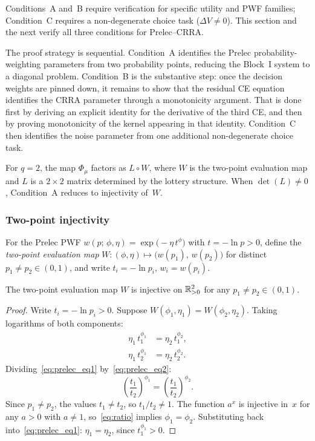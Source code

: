 Conditions~A and~B require verification for specific utility and
PWF families; Condition~C requires a non-degenerate choice task
($\Delta V \neq 0$). This section and the next verify all three
conditions for Prelec--CRRA.

The proof strategy is sequential. Condition~A identifies the Prelec
probability-weighting parameters from two probability points, reducing the
Block~I system to a diagonal problem. Condition~B is the substantive step: once
the decision weights are pinned down, it remains to show that the residual CE
equation identifies the CRRA parameter through a monotonicity argument. That is
done first by deriving an explicit identity for the derivative of the third CE,
and then by proving monotonicity of the kernel appearing in that identity.
Condition~C then identifies the noise parameter from one additional
non-degenerate choice task.

For $q = 2$, the map $\Phi_\mu$ factors as $L \circ W$, where
$W$ is the two-point evaluation map and $L$ is a $2 \times 2$
matrix determined by the lottery structure. When $\det(L) \neq 0$,
Condition~A reduces to injectivity of~$W$.

\subsubsection{Two-point injectivity}
\label{appB:two_point}

For the Prelec PWF
$w(p;\, \phi, \eta) = \exp\bigl(-\eta\, t^\phi\bigr)$ with
$t = -\ln p > 0$, define the \emph{two-point evaluation map}
$W \colon (\phi, \eta) \mapsto \bigl(w(p_1),\, w(p_2)\bigr)$
for distinct $p_1 \neq p_2 \in (0,1)$, and write
$t_i = -\ln p_i$, $w_i = w(p_i)$.

\begin{lemma}
\label{lem:prelec_two_point}
The two-point evaluation map $W$ is
injective on $\mathbb{R}^2_{>0}$ for any $p_1 \neq p_2 \in (0,1)$.
\end{lemma}

\begin{proof}
Write $t_i = -\ln p_i > 0$. Suppose
$W(\phi_1, \eta_1) = W(\phi_2, \eta_2)$. Taking logarithms of both
components:
\begin{align}
    \eta_1\, t_1^{\phi_1} &= \eta_2\, t_1^{\phi_2},
    \label{eq:prelec_eq1} \\
    \eta_1\, t_2^{\phi_1} &= \eta_2\, t_2^{\phi_2}.
    \label{eq:prelec_eq2}
\end{align}
Dividing~\eqref{eq:prelec_eq1} by~\eqref{eq:prelec_eq2}:
\begin{equation}
    \left(\frac{t_1}{t_2}\right)^{\!\phi_1}
    = \left(\frac{t_1}{t_2}\right)^{\!\phi_2}.
    \label{eq:ratio}
\end{equation}
Since $p_1 \neq p_2$, the values $t_1 \neq t_2$, so
$t_1/t_2 \neq 1$. The function $a^x$ is injective in~$x$ for any
$a > 0$ with $a \neq 1$, so~\eqref{eq:ratio} implies
$\phi_1 = \phi_2$. Substituting back
into~\eqref{eq:prelec_eq1}: $\eta_1 = \eta_2$, since
$t_1^{\phi_1} > 0$.
\end{proof}

